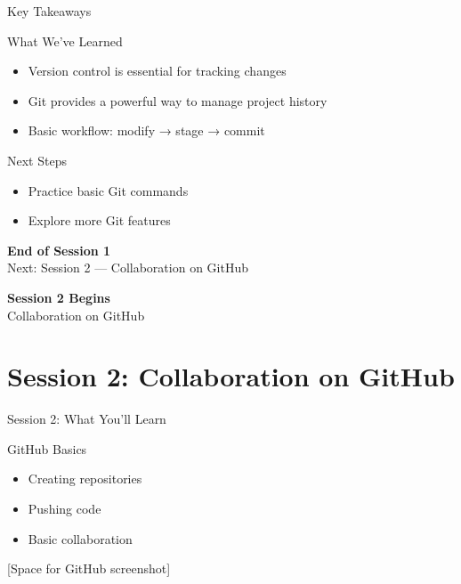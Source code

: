 \documentclass[aspectratio=169]{beamer}
\begin{document}
\begin{frame}{Key Takeaways}
  \begin{block}{What We've Learned}
    \begin{itemize}
      \item Version control is essential for tracking changes
      \item Git provides a powerful way to manage project history
      \item Basic workflow: modify → stage → commit
    \end{itemize}
  \end{block}
  
  \begin{block}{Next Steps}
    \begin{itemize}
      \item Practice basic Git commands
      \item Explore more Git features
    \end{itemize}
  \end{block}
\end{frame}

\begin{frame}
  \centering
  \Huge{\textbf{End of Session 1}}\\[0.5em]
  \large{Next: Session 2 — Collaboration on GitHub}
\end{frame}

\begin{frame}
  \centering
  \Huge{\textbf{Session 2 Begins}}\\[0.5em]
  \large{Collaboration on GitHub}
\end{frame}

\section{Session 2: Collaboration on GitHub}
\begin{frame}{Session 2: What You'll Learn}
      \begin{block}{GitHub Basics}
        \begin{itemize}
          \item Creating repositories
          \item Pushing code
          \item Basic collaboration
        \end{itemize}
      \end{block}
      
      \begin{center}
        [Space for GitHub screenshot]
      \end{center}
\end{frame}
\end{document}
